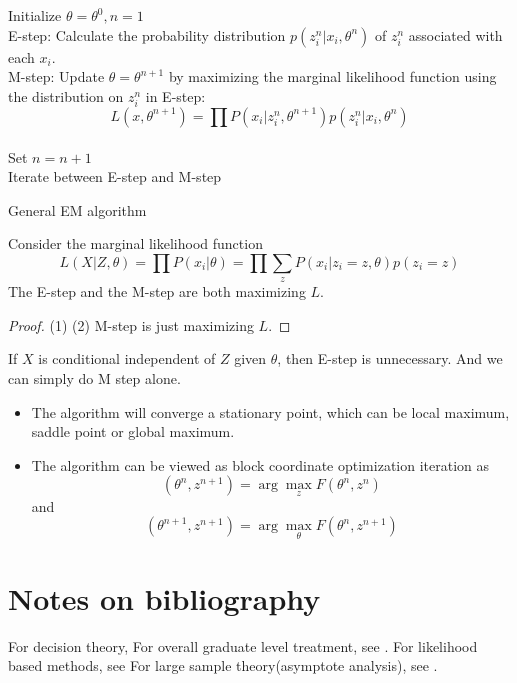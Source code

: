 \begin{refsection}
\begin{algorithm}[H]
	\SetAlgoLined
	Initialize $\theta = \theta^0, n=1$\\
	E-step: 
	Calculate the probability distribution $p(z_i^n|x_i,\theta^n)$ of $z_i^n$ associated with each $x_i$.\\
	
	M-step:
	Update $\theta = \theta^{n+1}$ by maximizing the marginal likelihood function using the distribution on $z_i^n$ in E-step:
	$$L(x,\theta^{n+1}) = \prod P(x_i|z_i^n, \theta^{n+1}) p(z_i^n|x_i,\theta^n)$$\\
	Set $n=n+1$\\
	Iterate between E-step and M-step\\
	\caption{General EM algorithm}
\end{algorithm}


\begin{lemma}
	Consider the marginal likelihood function 
	$$L(X|Z,\theta) = \prod P(x_i|\theta) = \prod \sum_z P(x_i|z_i = z,\theta) p(z_i = z)$$
	The E-step and the M-step are both maximizing $L$.
\end{lemma}
\begin{proof}
	(1) 
	(2) M-step is just maximizing $L$.
\end{proof}


\begin{remark}
	If $X$ is conditional independent of $Z$ given $\theta$, then E-step is unnecessary. And we can simply do M step alone.
\end{remark}


\begin{remark}\hfill
	\begin{itemize}
		\item The algorithm will converge a stationary point, which can be local maximum, saddle point or global maximum.
		\item The algorithm can be viewed as block coordinate optimization iteration as
		$$(\theta^n, z^{n+1}) = \arg\max_z F(\theta^{n},z^n)$$
		and
		$$(\theta^{n+1}, z^{n+1}) = \arg\max_\theta F(\theta^n,z^{n+1})$$		
	\end{itemize}
\end{remark}





\section{Notes on bibliography}
For decision theory, \cite{young2005essentials}\cite{moon2000mathematical}
For overall graduate level treatment, see \cite{casella2002statistical}\cite{hoggintroduction}.
For likelihood based methods, see \cite{pawitan2001all}
For large sample theory(asymptote analysis), see \cite{lehmann1999elements}.


\end{refsection}
